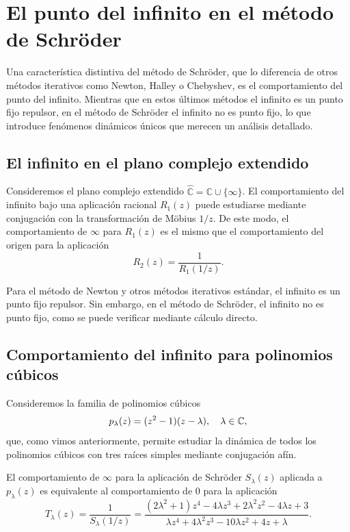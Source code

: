 \section{El punto del infinito en el método de Schröder}

Una característica distintiva del método de Schröder, que lo diferencia de otros métodos iterativos como Newton, Halley o Chebyshev, es el comportamiento del punto del infinito. Mientras que en estos últimos métodos el infinito es un punto fijo repulsor, en el método de Schröder el infinito no es punto fijo, lo que introduce fenómenos dinámicos únicos que merecen un análisis detallado.

\subsection{El infinito en el plano complejo extendido}

Consideremos el plano complejo extendido $\hat{\mathbb{C}}=\mathbb{C}\cup\{\infty\}$. El comportamiento del infinito bajo una aplicación racional $R_1(z)$ puede estudiarse mediante conjugación con la transformación de Möbius $1/z$. De este modo, el comportamiento de $\infty$ para $R_1(z)$ es el mismo que el comportamiento del origen para la aplicación
$$
R_2(z)=\frac{1}{R_1(1/z)}.
$$

Para el método de Newton y otros métodos iterativos estándar, el infinito es un punto fijo repulsor. Sin embargo, en el método de Schröder, el infinito no es punto fijo, como se puede verificar mediante cálculo directo.

\subsection{Comportamiento del infinito para polinomios cúbicos}

Consideremos la familia de polinomios cúbicos
\begin{equation}
p_\lambda(z)=(z^2-1)(z-\lambda), \quad \lambda\in\mathbb{C},
\label{eq:familia_cubica_inf}
\end{equation}
que, como vimos anteriormente, permite estudiar la dinámica de todos los polinomios cúbicos con tres raíces simples mediante conjugación afín.

El comportamiento de $\infty$ para la aplicación de Schröder $S_\lambda(z)$ aplicada a $p_\lambda(z)$ es equivalente al comportamiento de $0$ para la aplicación
\begin{equation}
T_\lambda(z)=\frac{1}{S_\lambda(1/z)}=\frac{(2\lambda^2+1)z^4-4\lambda z^3+2\lambda^2 z^2-4\lambda z+3}{\lambda z^4+4\lambda^2 z^3-10\lambda z^2+4z+\lambda}.
\label{eq:T_lambda_inf}
\end{equation}

